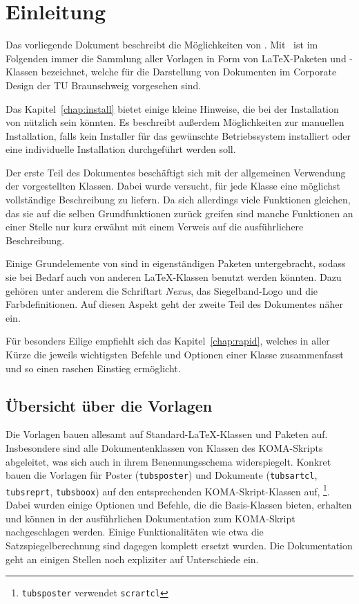 \chapter{Einleitung}

Das vorliegende Dokument beschreibt die Möglichkeiten von \tubslatex.
Mit \tubslatex\ ist im Folgenden immer die Sammlung aller Vorlagen in Form
von \LaTeX-Paketen und -Klassen bezeichnet, welche für die Darstellung von
Dokumenten im Corporate Design der TU Braunschweig vorgesehen sind.

Das Kapitel~\ref{chap:install} bietet einige kleine Hinweise, die bei
der Installation von \tubslatex nützlich sein könnten.
Es beschreibt außerdem Möglichkeiten zur manuellen Installation, falls
kein Installer für das gewünschte Betriebssystem installiert oder eine
individuelle Installation durchgeführt werden soll.

Der erste Teil des Dokumentes beschäftigt sich mit der allgemeinen Verwendung
der vorgestellten Klassen.
Dabei wurde versucht, für jede Klasse eine möglichst vollständige Beschreibung
zu liefern. Da sich allerdings viele Funktionen gleichen, das sie auf die selben
Grundfunktionen zurück greifen sind manche Funktionen an einer Stelle nur kurz
erwähnt mit einem Verweis auf die ausführlichere Beschreibung.

Einige Grundelemente von \tubslatex sind in eigenständigen Paketen untergebracht,
sodass sie bei Bedarf auch von anderen \LaTeX-Klassen benutzt werden könnten.
Dazu gehören unter anderem die Schriftart \emph{Nexus}, das Siegelband-Logo
und die Farbdefinitionen.
Auf diesen Aspekt geht der zweite Teil des Dokumentes näher ein.%

Für besonders Eilige empfiehlt sich das Kapitel~\ref{chap:rapid},
welches in aller Kürze die jeweils wichtigsten Befehle und Optionen einer Klasse
zusammenfasst und so einen raschen Einstieg ermöglicht.

\section{Übersicht über die Vorlagen}

Die Vorlagen bauen allesamt auf Standard-\LaTeX-Klassen und Paketen auf.
Insbesondere sind alle Dokumentenklassen von Klassen des KOMA-Skripts
abgeleitet, was sich auch in ihrem Benennungsschema widerspiegelt.
Konkret bauen die Vorlagen für Poster (\texttt{tubsposter}) und Dokumente
(\texttt{tubsartcl}, \texttt{tubsreprt}, \texttt{tubsboox}) auf
den entsprechenden KOMA-Skript-Klassen auf,%
\footnote{\texttt{tubsposter} verwendet \texttt{scrartcl}}.
Dabei wurden einige Optionen und Befehle, die die Basis-Klassen bieten, erhalten
und können in der ausführlichen Dokumentation zum KOMA-Skript\cite{koma-skript}
nachgeschlagen werden.
Einige Funktionalitäten wie etwa die Satzspiegelberechnung sind dagegen
komplett ersetzt wurden.
Die Dokumentation geht an einigen Stellen noch expliziter auf Unterschiede ein.

